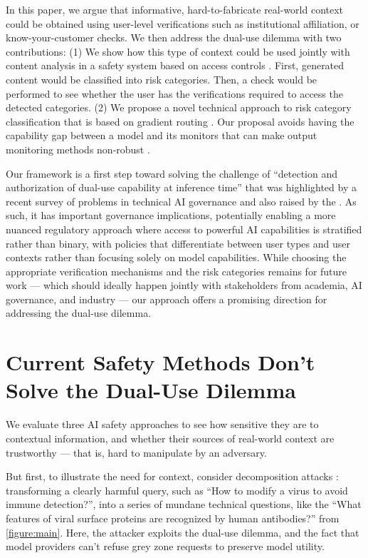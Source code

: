 \documentclass{article}
\theoremstyle{plain}
\theoremstyle{definition}
\theoremstyle{remark}
\begin{document}
In this paper, we argue that informative, hard-to-fabricate
real-world context could be obtained using user-level verifications
such as institutional affiliation, or know-your-customer checks. We
then address the dual-use dilemma with two contributions:
(1) We show how this type of context could be used jointly with
content analysis in a safety system based on access controls
\cite{butler1974}. First, generated content would be classified into
risk categories. Then, a check would be performed to see whether the
user has the verifications required to access the detected
categories. (2) We propose a novel technical approach to risk
category classification that is based on gradient routing
\cite{cloud2024gradientroutingmaskinggradients}. Our proposal avoids
having the capability gap between a model and its monitors that can
make output monitoring methods non-robust
\cite{jin2024jailbreakinglargelanguagemodels}.

Our framework is a first step toward solving the challenge of
``detection and authorization of dual-use capability at inference
time'' that was highlighted by a recent survey of problems in
technical AI governance \cite{reuel2025openproblemstechnicalai} and
also raised by the \citet{NIST_AI_800_1_ipd_2024}.
As such, it has important governance implications, potentially
enabling a more nuanced regulatory approach where access to powerful
AI capabilities is stratified rather than binary, with policies that
differentiate between user types and user contexts rather than
focusing solely on model capabilities. While choosing the appropriate
verification mechanisms and the risk categories remains for future
work --- which should ideally happen jointly with stakeholders from
academia, AI governance, and industry --- our approach offers a
promising direction for addressing the dual-use dilemma.

\section{Current Safety Methods Don't Solve the Dual-Use Dilemma}
\label{section:current-methods}

We evaluate three AI safety approaches to see how sensitive they are
to contextual information, and whether their sources of real-world
context are trustworthy --- that is, hard to manipulate by an adversary.


But first, to illustrate the need for context, consider decomposition
attacks \cite{glukhov2023llmcensorshipmachinelearning,
glukhov2024breachthousandleaksunsafe}: transforming a clearly harmful
query, such as ``How to modify a virus to avoid immune detection?'',
into a series of mundane technical questions, like the ``What
features of viral surface proteins are recognized by human
antibodies?'' from \cref{figure:main}. Here, the attacker exploits
the dual-use dilemma, and the fact that model providers can't refuse
grey zone requests to preserve model utility.
\end{document}
